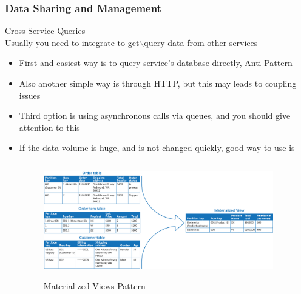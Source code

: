 \documentclass{beamer}
\begin{document}
	\begin{frame}
		\frametitle{Data Sharing and Management}
		Cross-Service Queries \\
		\vspace{1mm}
		\hspace{3mm} \scriptsize {Usually you need to integrate to get$\backslash$query data from other services}
		\vspace{1mm}
			\begin{itemize}
				\item<1-> \scriptsize{First and easiest way is to query service's database directly, \alert{Anti-Pattern}}
				\item<2-> \scriptsize{Also another simple way is through HTTP, but this may leads to coupling issues}
				\item<3-> \scriptsize{Third option is using asynchronous calls via queues, and you should give attention to this}
				\item<4-> \scriptsize{If the data volume is huge, and is not changed quickly, good way to use is}
					\begin{figure}[h]
						\includegraphics[width=100mm,height= 50mm, scale=1]{img/mat-view.png}
						\caption{Materialized Views Pattern}
					\end{figure}
			\end{itemize}
			
		\vspace{100mm}
	\end{frame}
\end{document}
